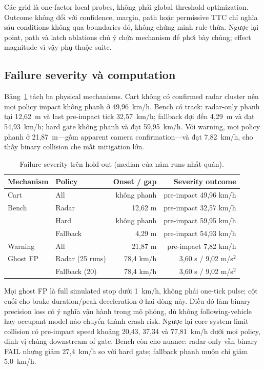 \documentclass[conference]{IEEEtran}
\begin{document}
Các grid là one-factor local probes, không phải global threshold optimization.
Outcome không đổi với confidence, margin, path hoặc permissive TTC chỉ nghĩa sáu
conditions không qua boundaries đó, không chứng minh rule thừa. Ngược lại point,
path và latch ablations chủ ý chứa mechanism để phơi bày chúng; effect magnitude
vì vậy phụ thuộc suite.

\subsection{Failure severity và computation}
Bảng~\ref{tab:severity} tách ba physical mechanisms. Cart không có confirmed
radar cluster nên mọi policy impact không phanh ở 49,96~km/h. Bench có track:
radar-only phanh tại 12,62~m và last pre-impact tick 32,57~km/h; fallback đợi đến
4,29~m và đạt 54,93~km/h; hard gate không phanh và đạt 59,95~km/h. Với warning,
mọi policy phanh ở 21,87~m---gồm apparent camera confirmation---và đạt
7,82~km/h, cho thấy binary collision che mất mitigation lớn.

\begin{table}[t]
\caption{Failure severity trên hold-out (median của năm runs nhất quán).}
\label{tab:severity}
\centering\scriptsize
\setlength{\tabcolsep}{3pt}
\begin{tabular}{llrr}
\toprule Mechanism & Policy & Onset / gap & Severity outcome\\ \midrule
Cart & All & không phanh & pre-impact 49,96 km/h\\
Bench & Radar & 12,62 m & pre-impact 32,57 km/h\\
 & Hard & không phanh & pre-impact 59,95 km/h\\
 & Fallback & 4,29 m & pre-impact 54,93 km/h\\
Warning & All & 21,87 m & pre-impact 7,82 km/h\\
\midrule
Ghost FP & Radar (25 runs) & 78,4 km/h & 3,60 s / 9,02 m/s$^2$\\
 & Fallback (20) & 78,4 km/h & 3,60 s / 9,02 m/s$^2$\\
\bottomrule
\end{tabular}
\end{table}

Mọi ghost FP là full simulated stop dưới 1~km/h, không phải one-tick pulse; cột
cuối cho brake duration/peak deceleration ở hai dòng này. Điều đó làm binary
precision loss có ý nghĩa vận hành trong mô phỏng, dù không following-vehicle hay
occupant model nào chuyển thành crash risk. Ngược lại core system-limit collision
có pre-impact speed khoảng 20,43, 37,34 và 77,81~km/h dưới mọi policy, định vị
chúng downstream of gate. Bench còn cho nuance: radar-only vẫn binary FAIL nhưng
giảm 27,4~km/h so với hard gate; fallback phanh muộn chỉ giảm 5,0~km/h.
\end{document}
